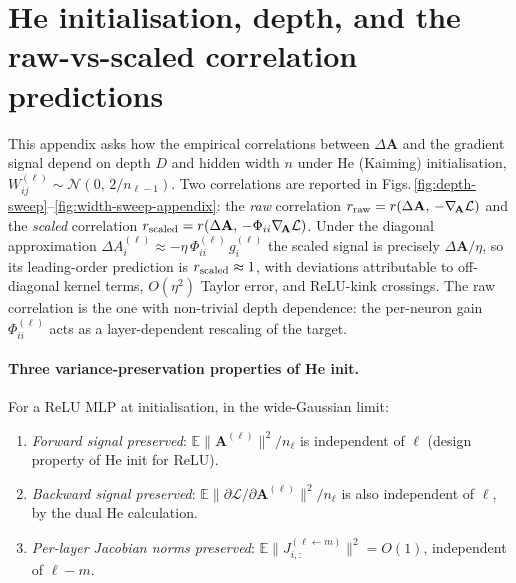 \documentclass[10pt]{article}
\newcommand{\vA}{\mathbf{A}}
\newcommand{\loss}{\mathcal{L}}
\begin{document}
\newpage
\appendix

\section{He initialisation, depth, and the raw-vs-scaled correlation predictions}

This appendix asks how the empirical correlations between $\Delta\vA$ and the gradient signal depend on depth $D$ and hidden width $n$ under He (Kaiming) initialisation, $W^{(\ell)}_{ij}\sim\mathcal{N}(0,\,2/n_{\ell-1})$.  Two correlations are reported in Figs.\,\ref{fig:depth-sweep}--\ref{fig:width-sweep-appendix}: the \emph{raw} correlation $r_{\rm raw}=r(\Delta\vA,\,-\nabla_{\!\vA}\loss)$ and the \emph{scaled} correlation $r_{\rm scaled}=r(\Delta\vA,\,-\Phi_{ii}\nabla_{\!\vA}\loss)$.  Under the diagonal approximation $\Delta A_i^{(\ell)}\approx-\eta\,\Phi^{(\ell)}_{ii}\,g_i^{(\ell)}$ the scaled signal is precisely $\Delta\vA/\eta$, so its leading-order prediction is $r_{\rm scaled}\approx 1$, with deviations attributable to off-diagonal kernel terms, $O(\eta^2)$ Taylor error, and ReLU-kink crossings.  The raw correlation is the one with non-trivial depth dependence: the per-neuron gain $\Phi^{(\ell)}_{ii}$ acts as a layer-dependent rescaling of the target.

\paragraph{Three variance-preservation properties of He init.}
For a ReLU MLP at initialisation, in the wide-Gaussian limit:
\begin{enumerate}
    \setlength\itemsep{0pt}
  \item[(i)] \emph{Forward signal preserved}: $\mathbb{E}\lVert\vA^{(\ell)}\rVert^2/n_\ell$ is independent of $\ell$ (design property of He init for ReLU).
  \item[(ii)] \emph{Backward signal preserved}: $\mathbb{E}\lVert\partial \loss/\partial\vA^{(\ell)}\rVert^2/n_\ell$ is also independent of $\ell$, by the dual He calculation.
  \item[(iii)] \emph{Per-layer Jacobian norms preserved}: $\mathbb{E}\lVert J^{(\ell\leftarrow m)}_{i,:}\rVert^2 = O(1)$, independent of $\ell-m$.
\end{enumerate}
\end{document}
